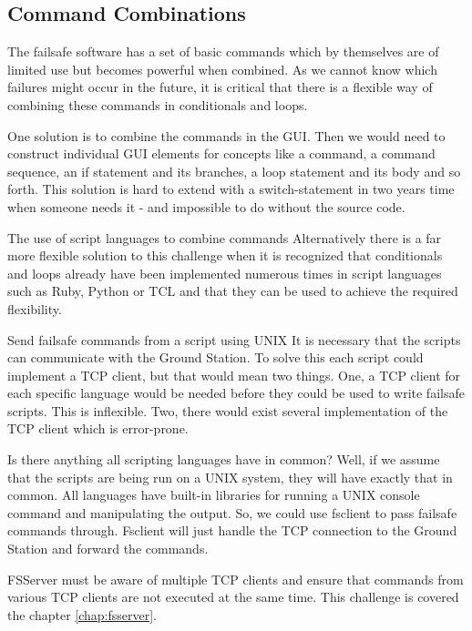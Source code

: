 \subsection{Command Combinations}
The failsafe software has a set of basic commands which by themselves are of limited use but becomes powerful when combined. As we cannot know which failures might occur in the future, it is critical that there is a flexible way of combining these commands in conditionals and loops.

One solution is to combine the commands in the GUI. Then we would need to construct individual GUI elements for concepts like a command, a command sequence, an if statement and its branches, a loop statement and its body and so forth. This solution is hard to extend with a switch-statement in two years time when someone needs it - and impossible to do without the source code.

The use of script languages to combine commands
Alternatively there is a far more flexible solution to this challenge when it is recognized that conditionals and loops already have been implemented numerous times in script languages such as Ruby, Python or TCL and that they can be used to achieve the required flexibility.

Send failsafe commands from a script using UNIX
It is necessary that the scripts can communicate with the Ground Station. To solve this each script could implement a TCP client, but that would mean two things. One, a TCP client for each specific language would be needed before they could be used to write failsafe scripts. This is inflexible. Two, there would exist several implementation of the TCP client which is error-prone.

Is there anything all scripting languages have in common? Well, if we assume that the scripts are being run on a UNIX system, they will have exactly that in common. All languages have built-in libraries for running a UNIX console command and manipulating the output. So, we could use fsclient to pass failsafe commands through. Fsclient will just handle the TCP connection to the Ground Station and forward the commands.

FSServer must be aware of multiple TCP clients and ensure that commands from various TCP clients are not executed at the same time. This challenge is covered the chapter \ref{chap:fsserver}.

